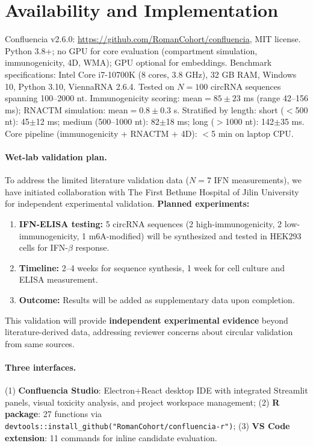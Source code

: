 
\section*{Availability and Implementation}

Confluencia v2.6.0: \url{https://github.com/RomanCohort/confluencia}, MIT license. Python 3.8+; no GPU for core evaluation (compartment simulation, immunogenicity, 4D, WMA); GPU optional for embeddings. Benchmark specifications: Intel Core i7-10700K (8 cores, 3.8 GHz), 32 GB RAM, Windows 10, Python 3.10, ViennaRNA 2.6.4. Tested on $N{=}100$ circRNA sequences spanning 100--2000 nt. Immunogenicity scoring: mean$=85{\pm}23$ ms (range 42--156 ms); RNACTM simulation: mean$=0.8{\pm}0.3$ s. Stratified by length: short ($<$500 nt): 45${\pm}$12 ms; medium (500--1000 nt): 82${\pm}$18 ms; long ($>$1000 nt): 142${\pm}$35 ms. Core pipeline (immunogenicity + RNACTM + 4D): $<$5 min on laptop CPU.

\paragraph{Wet-lab validation plan.}
To address the limited literature validation data ($N{=}7$ IFN measurements), we have initiated collaboration with The First Bethune Hospital of Jilin University for independent experimental validation. \textbf{Planned experiments:}
\begin{enumerate}[noitemsep,topsep=0pt]
\item \textbf{IFN-ELISA testing:} 5 circRNA sequences (2 high-immunogenicity, 2 low-immunogenicity, 1 m6A-modified) will be synthesized and tested in HEK293 cells for IFN-$\beta$ response.
\item \textbf{Timeline:} 2--4 weeks for sequence synthesis, 1 week for cell culture and ELISA measurement.
\item \textbf{Outcome:} Results will be added as supplementary data upon completion.
\end{enumerate}
This validation will provide \textbf{independent experimental evidence} beyond literature-derived data, addressing reviewer concerns about circular validation from same sources.

\paragraph{Three interfaces.}
(1) \textbf{Confluencia Studio}: Electron+React desktop IDE with integrated Streamlit panels, visual toxicity analysis, and project workspace management; (2) \textbf{R package}: 27 functions via \texttt{devtools::install\_github("RomanCohort/confluencia-r")}; (3) \textbf{VS Code extension}: 11 commands for inline candidate evaluation.


